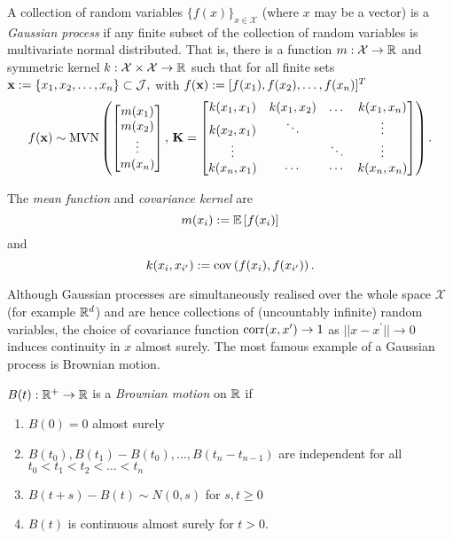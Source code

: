 \begin{definition}\label{def:gp}
    A collection of random variables $\{f(x)\}_{x\in\mathcal{X}}$
    (where $x$ may be a vector) is a \emph{Gaussian process} if any finite
    subset of the collection of random variables is multivariate normal
    distributed. That is, there is a function $m:\mathcal{X}\to\mathbb{R}$ and
    symmetric kernel $k:\mathcal{X}\times\mathcal{X}\to \mathbb{R}$ such that for all
    finite sets
    $\mathbf{x} :=\{x_1, x_2, \dots, x_n\} \subset \mathcal{J},$ with
    $f(\mathbf{x}) := [f(x_1), f(x_2), \dots, f(x_n)]^T$
    $$f(\mathbf{x}) \sim
        \operatorname{MVN}\left(\begin{bmatrix}
            m(x_1) \\ m(x_2)\\ \vdots\\ m(x_n)
        \end{bmatrix},\, \mathbf{K} = \begin{bmatrix}
            k(x_1, x_1) & k(x_1, x_2) & \dots  & k(x_1, x_n) \\
            k(x_2, x_1) & \ddots      &        & \vdots      \\
            \vdots      &             & \ddots & \vdots      \\
            k(x_n, x_1) & \cdots      & \cdots & k(x_n, x_n)
        \end{bmatrix}\right).$$
\end{definition}

\begin{definition}\label{def:mean_kernel}
    The \emph{mean function} and \emph{covariance kernel} are
    $$m(x_i) := \operatorname{\mathbb{E}}\left[f(x_i)\right]$$ and
    $$k(x_{i}, x_{i^\prime}) := \operatorname{cov}\left(f(x_i), f(x_{i^\prime})\right).$$
\end{definition}

Although Gaussian processes are simultaneously realised over the whole space
$\mathcal{X}$ (for example $\mathbb{R}^d$) and are hence collections of
(uncountably infinite)
random variables, the choice of covariance function
$\operatorname{corr}(x, x^\prime) \to 1$ as $||x - x^\prime||\to 0$
induces continuity in $x$ almost
surely. The most famous example of a Gaussian process is Brownian motion.

\begin{definition}
    $B(t):\mathbb{R}^+ \to \mathbb{R}$ is a \emph{Brownian motion} on $\mathbb{R}$ if\begin{enumerate}
        \item $B(0) = 0$ almost surely
        \item $B(t_0), B(t_1) - B(t_0), \dots, B(t_n - t_{n-1})$ are
              independent for all $t_0<t_1<t_2<\dots<t_n$
        \item $B(t + s) - B(t)\sim N(0, s)$ for $s, t \geq 0$
        \item $B(t)$ is continuous almost surely for $t>0.$
    \end{enumerate}
\end{definition}

